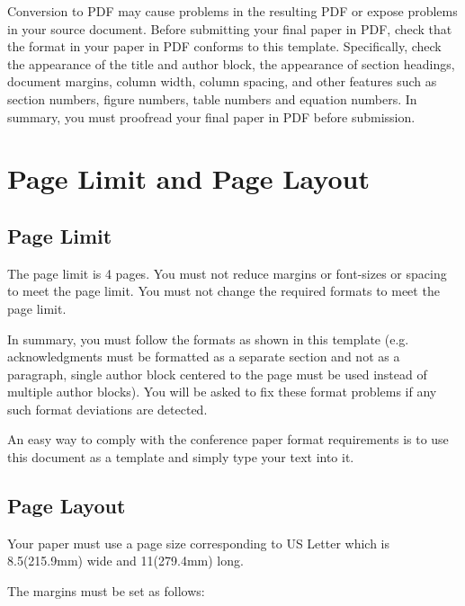 \documentclass[conference,10pt,letterpaper]{IEEEtran}%
\begin{document}
Conversion to PDF may cause problems in the resulting PDF or expose
problems in your source document. Before submitting your final paper
in PDF, check that the format in your paper in PDF conforms to this
template. Specifically, check the appearance of the title and author
block, the appearance of section headings, document margins, column
width, column spacing, and other features such as section numbers,
figure numbers, table numbers and equation numbers. In summary, you
must proofread your final paper in PDF before submission.


\section{Page Limit and Page Layout}


\subsection{Page Limit}

The page limit is 4 pages. You must not reduce margins or font-sizes
or spacing to meet the page limit. You must not change the required
formats to meet the page limit.

In summary, you must follow the formats as shown in this template
(e.g. acknowledgments must be formatted as a separate section and not
as a paragraph, single author block centered to the page must be used
instead of multiple author blocks). You will be asked to fix these
format problems if any such format deviations are detected.

An easy way to comply with the conference paper format requirements is
to use this document as a template and simply type your text into it.


\subsection{Page Layout}

Your paper must use a page size corresponding to US Letter which is
8.5\textquotedbl (215.9mm) wide and 11\textquotedbl (279.4mm) long.

The margins must be set as follows:
\end{document}
